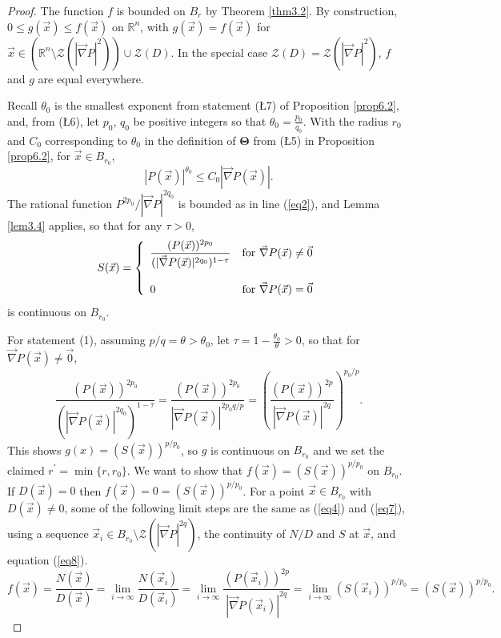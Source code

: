 \documentclass[12pt]{amsart}
\theoremstyle{definition}
\theoremstyle{remark}
\numberwithin{equation}{section}
\newcommand{\re}{\mathbb{R}}
\newcommand{\vv}{\mathcal{Z}}
\begin{document}
\begin{proof}
  The function $f$ is bounded on $B_r$ by Theorem \ref{thm3.2}.  By construction, $0\le g(\vec x)\le f(\vec x)$ on $\re^n$, with $g(\vec x)=f(\vec x)$ for $\vec x\in(\re^n\setminus\vv(|\vec\nabla P|^2))\cup\vv(D)$.   In the special case $\vv(D)=\vv(|\vec\nabla P|^2)$, $f$ and $g$ are equal everywhere.
  
  Recall $\theta_0$ is the smallest exponent from statement (\L7) of Proposition \ref{prop6.2}, and, from (\L6), let $p_0$, $q_0$ be positive integers so that $\displaystyle{\theta_0=\frac{p_0}{q_0}}$.  With the radius $r_0$ and $C_0$ corresponding to $\theta_0$ in the definition of $\mathbf\Theta$ from (\L5) in Proposition \ref{prop6.2}, for $\vec x\in B_{r_0}$, 
\begin{equation}\label{eq4.5}
  |P(\vec x)|^{\theta_0}\le C_0|\vec\nabla P(\vec x)|.
\end{equation}
The rational function $P^{2p_0}/|\vec\nabla P|^{2q_0}$ is bounded as in line (\ref{eq2}), and Lemma \ref{lem3.4} applies, so that for any $\tau>0$,
$$S(\vec x)=\left\{\begin{array}{ll}{\displaystyle{\frac{(P(\vec x))^{2p_0}}{(|\vec\nabla P(\vec x)|^{2q_0})^{1-\tau}}}} & \mbox{\rm{for} $\vec\nabla P(\vec x)\ne\vec0$}\\ & \\0& \mbox{\rm{for} $\vec\nabla P(\vec x)=\vec0$} \end{array}\right.$$
 is continuous on $B_{r_0}$.

 For statement (1), assuming $p/q=\theta>\theta_0$, let $\displaystyle{\tau=1-\frac{\theta_0}{\theta}>0}$, so that for $\vec\nabla P(\vec x)\ne\vec0$,
 \begin{equation}\label{eq8}
   \frac{(P(\vec x))^{2p_0}}{(|\vec\nabla P(\vec x)|^{2q_0})^{1-\tau}}=\frac{(P(\vec x))^{2p_0}}{|\vec\nabla P(\vec x)|^{2p_0q/p}}=\left(\frac{(P(\vec x))^{2p}}{|\vec\nabla P(\vec x)|^{2q}}\right)^{p_0/p}.
   \end{equation}
This shows $g(x)=(S(\vec x))^{p/p_0}$, so $g$ is continuous on $B_{r_0}$ and we set the claimed $r^\prime=\min\{r,r_0\}$.  We want to show that $f(\vec x)=(S(\vec x))^{p/p_0}$ on $B_{r_0}$.  If $D(\vec x)=0$ then $f(\vec x)=0=(S(\vec x))^{p/p_0}$.  For a point $\vec x\in B_{r_0}$ with $D(\vec x)\ne0$, some of the following limit steps are the same as (\ref{eq4}) and (\ref{eq7}), using a sequence $\vec x_i\in B_{r_0}\setminus\vv(|\vec\nabla P|^{2q})$, the continuity of $N/D$ and $S$ at $\vec x$, and equation (\ref{eq8}).
 \begin{equation}
  f(\vec x)=\frac{N(\vec x)}{D(\vec x)}=\lim_{i\to\infty}\frac{N(\vec x_i)}{D(\vec x_i)}=\lim_{i\to\infty}\frac{(P(\vec x_i))^{2p}}{\left|\vec\nabla P(\vec x_i)\right|^{2q}}=\lim_{i\to\infty}(S(\vec x_i))^{p/p_0}=(S(\vec x))^{p/p_0}.\nonumber
\end{equation}


\end{proof}
\end{document}
